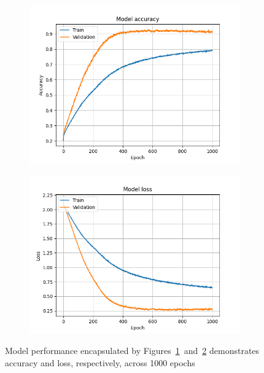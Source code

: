 \documentclass[a4paper,12pt]{article}
\begin{document}
\begin{figure}[h]
    \centering
    \begin{subfigure}[b]{0.45\textwidth}
        \centering
        \includegraphics[width=\textwidth]{../training/model-accuracy.png}
        \caption{}
        \label{fig:subfig1}
    \end{subfigure}
    \hfill
    \begin{subfigure}[b]{0.45\textwidth}
        \centering
        \includegraphics[width=\textwidth]{../training/model-loss.png}
        \caption{}
        \label{fig:subfig2}
    \end{subfigure}
    \caption{Model performance encapsulated by Figures~\ref{fig:subfig1}~and~\ref{fig:subfig2} demonstrates accuracy and loss, respectively,  across 1000 epochs}
    \label{fig:overall}
\end{figure}
\end{document}

